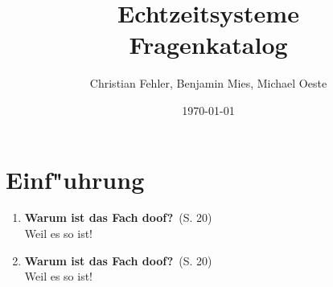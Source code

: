 \documentclass[a4paper,fleqn,latin1,twoside,12pt]{report}
\title{{\Huge Echtzeitsysteme}\\Fragenkatalog}
\author{{\Large Christian Fehler, Benjamin Mies, Michael Oeste}}
\date{\small\today}
\newcommand{\question}[3]
{\item {\textbf{#1}}\ (S. #2)\\#3}
\begin{document}
\maketitle
\tableofcontents
\newpage

\chapter{Einf"uhrung}

\begin{enumerate}
  \question
  {Warum ist das Fach doof?}{20}
  {Weil es so ist!}

  \question
  {Warum ist das Fach doof?}{20}
  {Weil es so ist!}
\end{enumerate}
\end{document}
